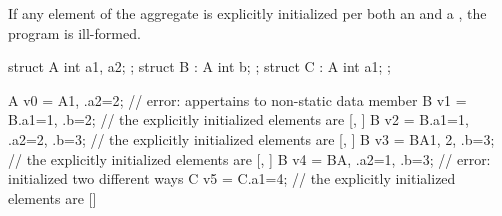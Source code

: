 If any element of the aggregate is explicitly initialized per
both an  and
a ,
the program is ill-formed.
\begin{example}
\begin{codeblock}
struct A { int a1, a2; };
struct B : A { int b; };
struct C : A { int a1; };

A v0 = A{1, .a2=2};             // error:  appertains to non-static data member
B v1 = B{.a1=1, .b=2};          // the explicitly initialized elements are \textnormal{[}, \textnormal{]}
B v2 = B{.a1=1, .a2=2, .b=3};   // the explicitly initialized elements are \textnormal{[}, \textnormal{]}
B v3 = B{A{1, 2}, .b=3};        // the explicitly initialized elements are \textnormal{[}, \textnormal{]}
B v4 = B{A{}, .a2=1, .b=3};     // error:  initialized two different ways
C v5 = C{.a1=4};                // the explicitly initialized elements are \textnormal{[}\textnormal{]}
\end{codeblock}
\end{example}

